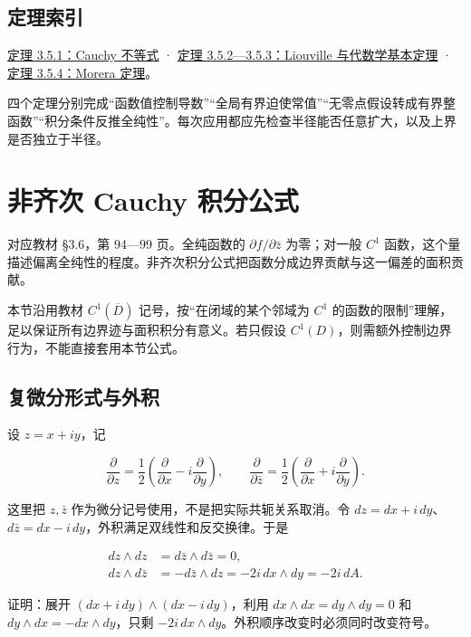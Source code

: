 \documentclass[11pt,a4paper]{article}
\begin{document}
\subsection{定理索引}\label{ch03-s5-ux5b9aux7406ux7d22ux5f15}

\hyperref[ch03-s5-cauchy-ux4e0dux7b49ux5f0f]{定理 3.5.1：Cauchy 不等式} ·
\hyperref[ch03-s5-liouville-ux5b9aux7406ux4e0eux4ee3ux6570ux5b66ux57faux672cux5b9aux7406]{定理
3.5.2---3.5.3：Liouville 与代数学基本定理} ·
\hyperref[ch03-s5-morera-ux5b9aux7406]{定理 3.5.4：Morera 定理}。

四个定理分别完成``函数值控制导数''``全局有界迫使常值''``无零点假设转成有界整函数''``积分条件反推全纯性''。每次应用都应先检查半径能否任意扩大，以及上界是否独立于半径。

\section{非齐次 Cauchy 积分公式}
对应教材 §3.6，第 94---99 页。全纯函数的 \(\partial f/\partial\bar z\)
为零；对一般 \(C^1\)
函数，这个量描述偏离全纯性的程度。非齐次积分公式把函数分成边界贡献与这一偏差的面积贡献。

本节沿用教材 \(C^1(\overline D)\) 记号，按``在闭域的某个邻域为 \(C^1\)
的函数的限制''理解，足以保证所有边界迹与面积积分有意义。若只假设
\(C^1(D)\)，则需额外控制边界行为，不能直接套用本节公式。

\subsection{复微分形式与外积}\label{ch03-s6-ux590dux5faeux5206ux5f62ux5f0fux4e0eux5916ux79ef}

设 \(z=x+iy\)，记

\[
\frac{\partial}{\partial z}=\frac12\left(\frac{\partial}{\partial x}-i\frac{\partial}{\partial y}\right),
\qquad
\frac{\partial}{\partial\bar z}=\frac12\left(\frac{\partial}{\partial x}+i\frac{\partial}{\partial y}\right).
\]

这里把 \(z,\bar z\) 作为微分记号使用，不是把实际共轭关系取消。令
\(dz=dx+i\,dy\)、\(d\bar z=dx-i\,dy\)，外积满足双线性和反交换律。于是

\[
\begin{aligned}
dz\wedge dz&=d\bar z\wedge d\bar z=0,\\
dz\wedge d\bar z&=-d\bar z\wedge dz=-2i\,dx\wedge dy=-2i\,dA.
\end{aligned}
\]

证明：展开 \((dx+i\,dy)\wedge(dx-i\,dy)\)，利用
\(dx\wedge dx=dy\wedge dy=0\) 和 \(dy\wedge dx=-dx\wedge dy\)，只剩
\(-2i\,dx\wedge dy\)。外积顺序改变时必须同时改变符号。
\end{document}

